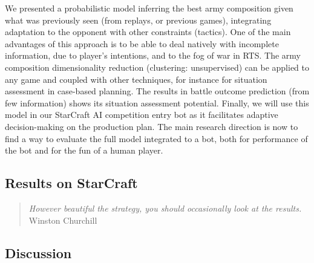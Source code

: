 We presented a probabilistic model inferring the best army composition given what was previously seen (from replays, or previous games), integrating adaptation to the opponent with other constraints (tactics). One of the main advantages of this approach is to be able to deal natively with incomplete information, due to player's intentions, and to the fog of war in RTS. The army composition dimensionality reduction (clustering: unsupervised) can be applied to any game and coupled with other techniques, for instance for situation assessment in case-based planning. The results in battle outcome prediction (from few information) shows its situation assessment potential. Finally, we will use this model in our StarCraft AI competition entry bot as it facilitates adaptive decision-making on the production plan. The main research direction is now to find a way to evaluate the full model integrated to a bot, both for performance of the bot and for the fun of a human player.


\subsection{Results on StarCraft}

\begin{quotation}\textit{
However beautiful the strategy, you should occasionally look at the results.
} Winston Churchill\end{quotation}

\subsection{Discussion}

